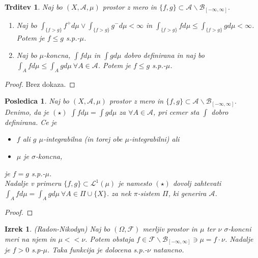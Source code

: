 \documentclass[a4paper,12pt]{article}
\theoremstyle{definition} %
\theoremstyle{plain} %
\newtheorem{izrek}[definicija]{Izrek}
\newtheorem{trditev}[definicija]{Trditev}
\newtheorem{posledica}[definicija]{Posledica}
\newcommand{\F}{\mathcal{F}}
\newcommand{\A}{\mathcal{A}}
\newcommand{\B}{\mathcal{B}}
\newcommand{\Le}{\mathcal{L}}
\begin{document}
            \begin{trditev}
                Naj bo $(X, \A, \mu)$ prostor z mero in $\{f, g\} \subset \A\backslash\B_{[-\infty, \infty]}.$
                \begin{enumerate}
                    \item Naj bo $\int_{\{f > g\}}f^+d\mu \vee \int_{\{f > g\}}g^-d\mu < \infty$ in $\int_{\{f > g\}}fd\mu \leq \int_{\{f > g\}}gd\mu < \infty$. Potem je $f \leq g$ s.p.-$\mu$.
                    \item Naj bo $\mu$-koncna, $\int fd\mu$ in $\int gd\mu$  dobro definirana in naj bo $\int_{A}fd\mu \leq \int_{A}gd\mu \ \forall A \in \A$. Potem je $f \leq g$ s.p.-$\mu$.
                \end{enumerate}
            \end{trditev}

            \begin{proof}
                Brez dokaza.
            \end{proof}

            \begin{posledica}
                Naj bo $(X, \A, \mu)$ prostor z mero in $\{f, g\} \subset \A\backslash\B_{[-\infty, \infty]}.$ Denimo, da je $(\star)$ $\int fd\mu = \int gd\mu$ za $\forall A \in \A$, pri cemer sta $\int$ dobro definirana. Ce je 
                \begin{itemize}
                    \item $f$ ali $g$ $\mu$-integrabilna (in torej obe $\mu$-integrabilni) ali 
                    \item $\mu$ je $\sigma$-koncna,
                \end{itemize}
                je $f = g$ s.p.-$\mu$. \\
                Nadalje v primeru $\{f, g\} \subset \Le^1(\mu)$ je namesto $(\star)$ dovolj zahtevati $\int_Afd\mu = \int_Agd\mu \ \forall A \in \Pi\cup\{X\}$. za nek $\pi$-sistem $\Pi$, ki generira $\A$. 
            \end{posledica}

            \begin{proof}
                
            \end{proof}

            \begin{izrek}(Radon-Nikodyn)
                Naj bo $(\Omega, \F)$ merljiv prostor in $\mu$ ter $\nu$ $\sigma$-koncni meri na njem in $\mu << \nu$. Potem obstaja $f \in \F\backslash\mathcal{B}_{[-\infty, \infty]} \ni \mu = f\cdot\nu$. Nadalje je $f>0$ s.p-$\mu$. Taka funkcija je dolocena s.p.-$\nu$ natancno. 
            \end{izrek}
\end{document}
